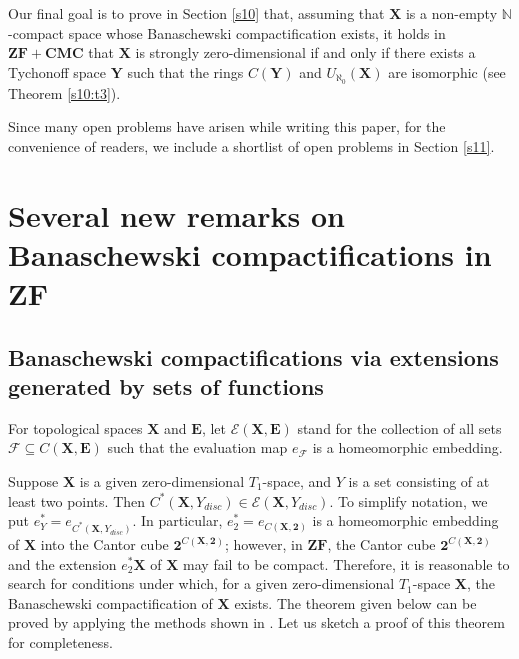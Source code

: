 \documentclass[12pt,twoside,leqno]{article}
\theoremstyle{plain}
\theoremstyle{definition}
\theoremstyle{remark}
\begin{document}
Our final goal is to prove in Section \ref{s10} that, assuming that $\mathbf{X}$ is a non-empty $\mathbb{N}$-compact space whose Banaschewski compactification exists, it holds in $\mathbf{ZF+CMC}$ that $\mathbf{X}$ is strongly zero-dimensional if and only if there exists a Tychonoff space $\mathbf{Y}$ such that the rings $C(\mathbf{Y})$ and $U_{\aleph_0}(\mathbf{X})$ are isomorphic (see Theorem \ref{s10:t3}).

Since many open problems have arisen while writing this paper, for the convenience of readers, we include a shortlist of open problems in Section \ref{s11}.

\section{Several new remarks on Banaschewski compactifications in $\mathbf{ZF}$}
\label{s2}

\subsection{Banaschewski compactifications via extensions generated by sets of functions}
\label{s2.1}

For topological spaces $\mathbf{X}$ and $\mathbf{E}$, let $\mathcal{E}(\mathbf{X}, \mathbf{E})$ stand for the collection of all sets $\mathcal{F}\subseteq C(\mathbf{X}, \mathbf{E})$ such that the evaluation map $e_{\mathcal{F}}$ is a homeomorphic embedding. 

Suppose $\mathbf{X}$ is a given zero-dimensional $T_1$-space, and $Y$ is a set consisting of at least two points. Then $C^{\ast}(\mathbf{X}, Y_{disc})\in \mathcal{E}(\mathbf{X}, Y_{disc})$. To simplify notation, we put $e_{Y}^{\ast}=e_{C^{\ast}(\mathbf{X}, Y_{disc})}$. In particular, $e^{\ast}_2=e_{C(\mathbf{X}, \mathbf{2})}$  is a homeomorphic embedding of $\mathbf{X}$ into the Cantor cube $\mathbf{2}^{C(\mathbf{X},\mathbf{2})}$; however, in $\mathbf{ZF}$, the Cantor cube  $\mathbf{2}^{C(\mathbf{X},\mathbf{2})}$ and the extension $e^{\ast}_{2}\mathbf{X}$ of $\mathbf{X}$ may fail to be compact. Therefore, it is reasonable to search for conditions under which, for a given zero-dimensional $T_1$-space $\mathbf{X}$, the Banaschewski compactification of $\mathbf{X}$ exists. The theorem given below can be proved by applying the methods shown in \cite{kw1}. Let us sketch a proof of this theorem for completeness.
\end{document}
